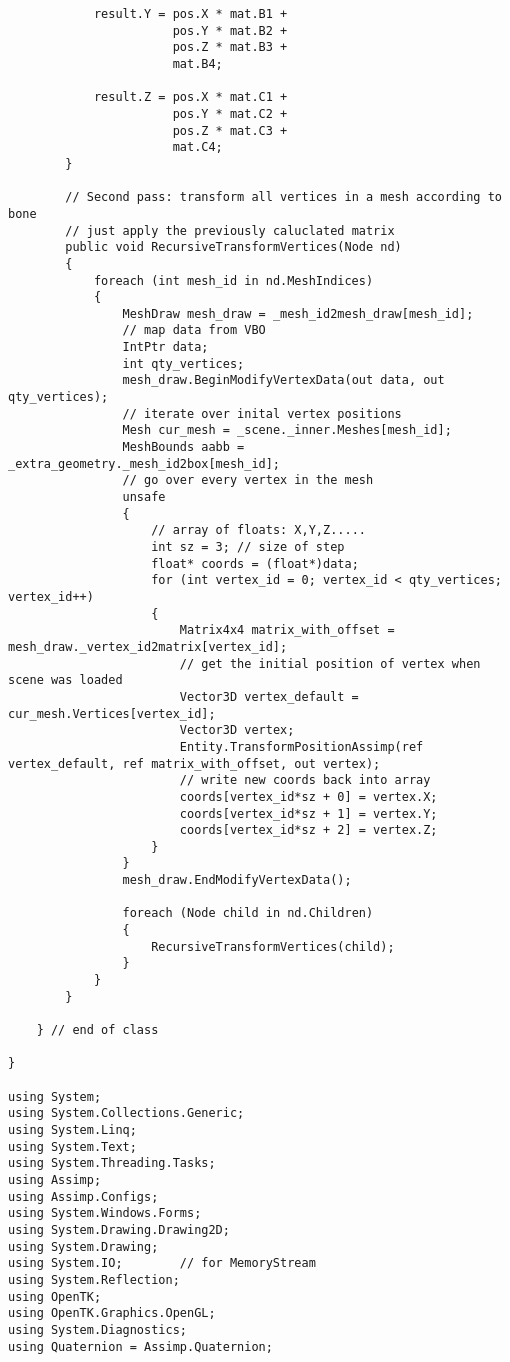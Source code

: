 \begin{scriptsize}
\begin{verbatim}
            result.Y = pos.X * mat.B1 +
                       pos.Y * mat.B2 +
                       pos.Z * mat.B3 +
                       mat.B4;

            result.Z = pos.X * mat.C1 +
                       pos.Y * mat.C2 +
                       pos.Z * mat.C3 +
                       mat.C4;
        }

        // Second pass: transform all vertices in a mesh according to bone
        // just apply the previously caluclated matrix
        public void RecursiveTransformVertices(Node nd)
        {
            foreach (int mesh_id in nd.MeshIndices)
            {
                MeshDraw mesh_draw = _mesh_id2mesh_draw[mesh_id];
                // map data from VBO
                IntPtr data;
                int qty_vertices;
                mesh_draw.BeginModifyVertexData(out data, out qty_vertices);
                // iterate over inital vertex positions
                Mesh cur_mesh = _scene._inner.Meshes[mesh_id];
                MeshBounds aabb = _extra_geometry._mesh_id2box[mesh_id];
                // go over every vertex in the mesh
                unsafe
                {
                    // array of floats: X,Y,Z.....
                    int sz = 3; // size of step
                    float* coords = (float*)data;
                    for (int vertex_id = 0; vertex_id < qty_vertices; vertex_id++)
                    {
                        Matrix4x4 matrix_with_offset = mesh_draw._vertex_id2matrix[vertex_id];
                        // get the initial position of vertex when scene was loaded
                        Vector3D vertex_default = cur_mesh.Vertices[vertex_id];
                        Vector3D vertex;
                        Entity.TransformPositionAssimp(ref vertex_default, ref matrix_with_offset, out vertex);
                        // write new coords back into array
                        coords[vertex_id*sz + 0] = vertex.X;
                        coords[vertex_id*sz + 1] = vertex.Y;
                        coords[vertex_id*sz + 2] = vertex.Z;
                    }
                }
                mesh_draw.EndModifyVertexData();

                foreach (Node child in nd.Children)
                {
                    RecursiveTransformVertices(child);
                }
            }
        }

    } // end of class

}

using System;
using System.Collections.Generic;
using System.Linq;
using System.Text;
using System.Threading.Tasks;
using Assimp;
using Assimp.Configs;
using System.Windows.Forms;
using System.Drawing.Drawing2D;
using System.Drawing;
using System.IO;        // for MemoryStream
using System.Reflection;
using OpenTK;
using OpenTK.Graphics.OpenGL;
using System.Diagnostics;
using Quaternion = Assimp.Quaternion;


\end{verbatim}
\end{scriptsize}
